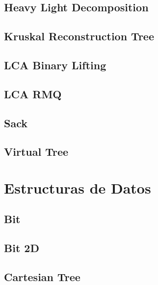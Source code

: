 \subsection{Heavy Light Decomposition}
\raggedbottom
\hrulefill
\subsection{Kruskal Reconstruction Tree}
\raggedbottom
\hrulefill
\subsection{LCA Binary Lifting}
\raggedbottom
\hrulefill
\subsection{LCA RMQ}
\raggedbottom
\hrulefill
\subsection{Sack}
\raggedbottom
\hrulefill
\subsection{Virtual Tree}
\raggedbottom
\hrulefill

\section{Estructuras de Datos}
\subsection{Bit}
\raggedbottom
\hrulefill
\subsection{Bit 2D}
\raggedbottom
\hrulefill
\subsection{Cartesian Tree}
\raggedbottom
\hrulefill
